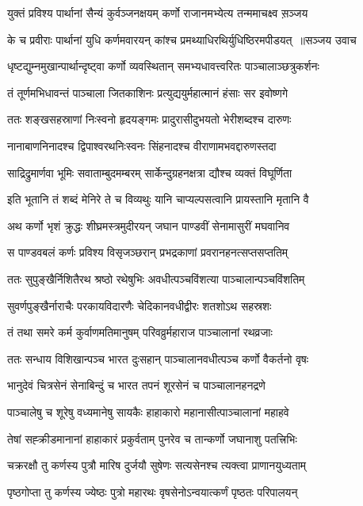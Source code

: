 \twolineshloka
{युक्तं प्रविश्य पार्थानां सैन्यं कुर्वञ्जनक्षयम्}
{कर्णो राजानमभ्येत्य तन्ममाचक्ष्व स़ञ्जय}


\threelineshloka
{के च प्रवीराः पार्थानां युधि कर्णमवारयन्}
{कांश्च प्रमथ्याधिरथिर्युधिष्ठिरमपीडयत् ॥सञ्जय उवाच}
{}


\twolineshloka
{धृष्टद्युम्नमुखान्पार्थान्दृष्ट्वा कर्णो व्यवस्थितान्}
{समभ्यधावत्त्वरितः पाञ्चालाञ्छत्रुकर्शनः}


\twolineshloka
{तं तूर्णमभिधावन्तं पाञ्चाला जितकाशिनः}
{प्रत्युद्ययुर्महात्मानं हंसाः सर इवोष्णगे}


\twolineshloka
{ततः शङ्खसहस्राणां निःस्वनो हृदयङ्गमः}
{प्रादुरासीदुभयतो भेरीशब्दश्च दारुणः}


\twolineshloka
{नानाबाणनिनादश्च द्विपाश्वरथनिःस्वनः}
{सिंहनादश्च वीराणामभवद्दारुणस्तदा}


\twolineshloka
{साद्रिद्रुमार्णवा भूमिः सवाताम्बुदमम्बरम्}
{सार्केन्दुग्रहनक्षत्रा द्यौश्च व्यक्तं विघूर्णिता}


\twolineshloka
{इति भूतानि तं शब्दं मेनिरे ते च विव्यथुः}
{यानि चाप्यल्पसत्वानि प्रायस्तानि मृतानि वै}


\twolineshloka
{अथ कर्णो भृशं क्रुद्धः शीघ्रमस्त्रमुदीरयन्}
{जघान पाण्डवीं सेनामासुरीं मघवानिव}


\twolineshloka
{स पाण्डवबलं कर्णः प्रविश्य विसृजञ्छरान्}
{प्रभद्रकाणां प्रवरानहनत्सप्तसप्ततिम्}


\twolineshloka
{ततः सुपुङ्खैर्निशितैरथ श्रष्ठो रथेषुभिः}
{अवधीत्पञ्चविंशत्या पाञ्चालान्पञ्चविंशतिम्}


\twolineshloka
{सुवर्णपुङ्खैर्नाराचैः परकायविदारणैः}
{चेदिकानवधीद्वीरः शतशोऽथ सहस्रशः}


\twolineshloka
{तं तथा समरे कर्म कुर्वाणमतिमानुषम्}
{परिवव्रुर्महाराज पाञ्चालानां रथव्रजाः}


\twolineshloka
{ततः सन्धाय विशिखान्पञ्च भारत दुःसहान्}
{पाञ्चालानवधीत्पञ्च कर्णो वैकर्तनो वृषः}


\twolineshloka
{भानुदेवं चित्रसेनं सेनाबिन्दुं च भारत}
{तपनं शूरसेनं च पाञ्चालानहनद्रणे}


\twolineshloka
{पाञ्चालेषु च शूरेषु वध्यमानेषु सायकैः}
{हाहाकारो महानासीत्पाञ्चालानां महाहवे}


\twolineshloka
{तेषां सह्क्रीडमानानां हाहाकारं प्रकुर्वताम्}
{पुनरेव च तान्कर्णो जघानाशु पतत्त्रिभिः}


\twolineshloka
{चक्ररक्षौ तु कर्णस्य पुत्रौ मारिष दुर्जयौ}
{सुषेणः सत्यसेनश्च त्यक्त्वा प्राणानयुध्यताम्}


\twolineshloka
{पृष्ठगोप्ता तु कर्णस्य ज्येष्ठः पुत्रो महारथः}
{वृषसेनोऽन्वयात्कर्णं पृष्ठतः परिपालयन्}


